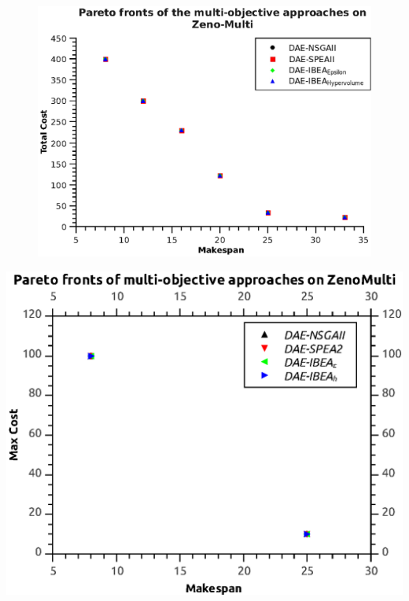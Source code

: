 \documentclass[a4paper,10pt]{report} %
\begin{document}
\newpage
\begin{figure}[ht]
\begin{center}
 \includegraphics[bb=0 -0.250000 370.750 278.250]{./pareto_zeno_add.eps}
\end{center}
\end{figure}

\begin{center}
 \includegraphics[bb=0 -0.250000 371.500 278.250]{./pareto_zeno_max.eps}
\end{center}
\end{document}
